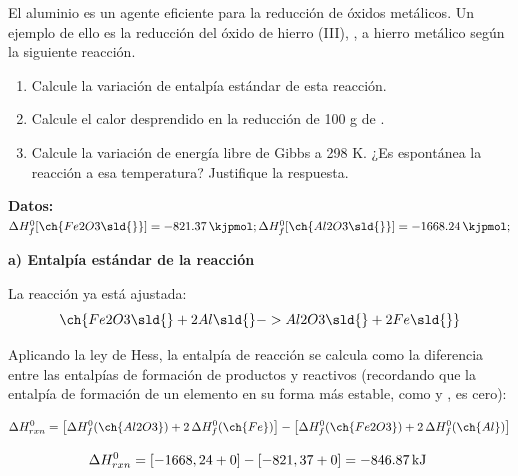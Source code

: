 \begin{exerciseEVAU}
    El aluminio es un agente eficiente para la reducción de óxidos metálicos. Un ejemplo de ello es la reducción
    del óxido de hierro (III), , a hierro metálico según la siguiente reacción.
    \begin{centeredequation}
    \end{centeredequation}
    \begin{enumerate}[label=\letraminuscula]
        \item Calcule la variación de entalpía estándar de esta reacción.
        \item Calcule el calor desprendido en la reducción de 100 g de .
        \item Calcule la variación de energía libre de Gibbs a 298 K. ¿Es espontánea la reacción a esa
        temperatura? Justifique la respuesta.
    \end{enumerate}
    \textbf{Datos:} \(  \Delta H^{0}_{f}  [\ch{Fe2O3 \sld{}}] = \qty{- 821,37}{\kjpmol}; \Delta H^{0}_{f}  [\ch{Al2O3 \sld{}}] = \qty{- 1668,24}{\kjpmol};
    \)

    \begin{solu}

        \textbf{a) Entalpía estándar de la reacción}

        La reacción ya está ajustada:
        \begin{equation*}
            \ch{Fe2O3 \sld{} + 2 Al \sld{} -> Al2O3 \sld{} + 2 Fe \sld{}}
        \end{equation*}

        Aplicando la ley de Hess, la entalpía de reacción se calcula como la diferencia entre las entalpías de formación de productos y reactivos (recordando que la entalpía de formación de un elemento en su forma más estable, como  y , es cero):

        \begin{equation*}
            \Delta H^0_{rxn} = \left[ \Delta H^0_f (\ch{Al2O3}) + 2\, \Delta H^0_f (\ch{Fe}) \right] - \left[ \Delta H^0_f (\ch{Fe2O3}) + 2\, \Delta H^0_f (\ch{Al}) \right]
        \end{equation*}

        \begin{equation*}
            \Delta H^0_{rxn} = \left[ -1668,24 + 0 \right] - \left[ -821,37 + 0 \right] = \energia[kj]{-846.87}
        \end{equation*}


\end{solu}
\end{exerciseEVAU}
